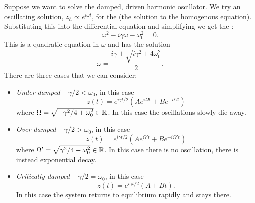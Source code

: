 \documentclass[a4paper]{article}
\begin{document}
    \begin{example}
        Suppose we want to solve the damped, driven harmonic oscillator.
        We try an oscillating solution, \(z_h\propto e^{i\omega t}\), for the  (the solution to the homogenous equation).
        Substituting this into the differential equation and simplifying we get the :
        \[\omega^2 - i\gamma\omega - \omega_0^2 = 0.\]
        This is a quadratic equation in \(\omega\) and has the solution
        \[\omega = \frac{i\gamma \pm \sqrt{i\gamma^2 + 4\omega_0^2}}{2}.\]
        There are three cases that we can consider:
        \begin{itemize}
            \item \textit{Under damped} -- \(\gamma/2 < \omega_0\), in this case
            \[z(t) = e^{i\gamma t/2}(Ae^{i\Omega t} + Be^{-i\Omega t})\]
            where \(\Omega = \sqrt{-\gamma^2/4 + \omega_0^2}\in\mathbb{R}\).
            In this case the oscillations slowly die away.
            \item \textit{Over damped} -- \(\gamma/2 > \omega_0\), in this case
            \[z(t) = e^{i\gamma t/2}(Ae^{\Omega't} + Be^{-i\Omega' t})\]
            where \(\Omega' = \sqrt{\gamma^2/4 - \omega_0^2}\in\mathbb{R}\).
            In this case there is no oscillation, there is instead exponential decay.
            \item \textit{Critically damped} -- \(\gamma/2 = \omega_0\), in this case
            \[z(t) = e^{i\gamma t/2}(A + Bt).\]
            In this case the system returns to equilibrium rapidly and stays there.
        \end{itemize}
    \end{example}
    
\end{document}
